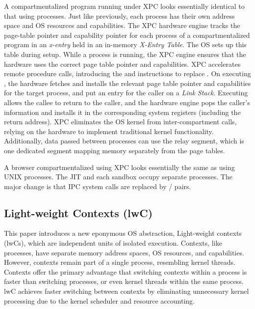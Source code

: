 A compartmentalized program running under XPC looks essentially identical
to that using processes.
Just like previously, each process has their own address space and OS 
resources and capabilities.
The XPC hardware engine tracks the page-table pointer and capability pointer
for each process of a compartmentalized program in an \emph{x-entry} held in
an in-memory \emph{X-Entry Table}.
The OS sets up this table during setup.
While a process is running, the XPC engine ensures that the hardware uses the
correct page table pointer and capabilities.
XPC accelerates remote procedure calls, introducing the  and
 instructions to replace .
On executing , the hardware fetches and installs the relevant 
page table pointer and capabilities for the target process, 
and put an entry for the caller on a \emph{Link Stack}.
Executing  allows the callee to return to the caller, and the
hardware engine pops the caller's information and installs it in the
corresponding system registers (including the return address). 
XPC eliminates the OS kernel from inter-compartment calls, relying on the 
hardware to implement traditional kernel functionality.
Additionally, data passed between processes can use the relay segment, which
is one dedicated segment mapping memory separately from the page tables.

A browser compartmentalized using XPC looks essentially the same as
using UNIX processes. 
The JIT and each sandbox occupy separate processes.
The major change is that IPC system calls are replaced by 
/ pairs.

\subsection{Light-weight Contexts (lwC)}
This paper introduces a new eponymous OS abstraction,
Light-weight contexts (lwCs),
which are independent units of isolated execution.
Contexts, like processes, have separate memory address spaces, OS resources,
and capabilities.
However, contexts remain part of a single process, resembling kernel threads.
Contexts offer the primary advantage that switching contexts within a process is 
faster than switching processes, or even kernel threads within the same process.
lwC achieves faster switching between contexts by eliminating unnecessary kernel
processing due to the kernel scheduler and resource accounting.

